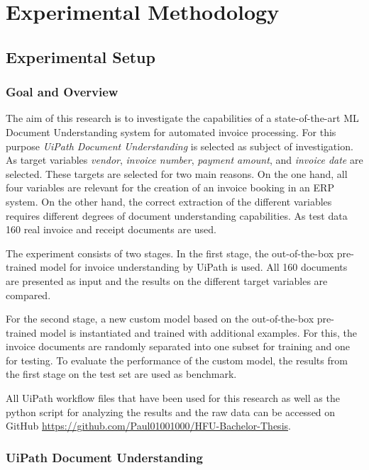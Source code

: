 \chapter{Experimental Methodology}

\section{Experimental Setup}
\subsection{Goal and Overview}
The aim of this research is to investigate the capabilities of a state-of-the-art \acl{ML} Document Understanding system for automated invoice processing. For this purpose \textit{UiPath Document Understanding} is selected as subject of investigation. As target variables \textit{vendor}, \textit{invoice number}, \textit{payment amount}, and \textit{invoice date} are selected. These targets are selected for two main reasons. On the one hand, all four variables are relevant for the creation of an invoice booking in an ERP system. On the other hand, the correct extraction of the different variables requires different degrees of document understanding capabilities. As test data 160 real invoice and receipt documents are used.

The experiment consists of two stages. In the first stage, the out-of-the-box pre-trained model for invoice understanding by UiPath is used. All 160 documents are presented as input and the results on the different target variables are compared. 

For the second stage, a new custom model based on the out-of-the-box pre-trained model is instantiated and trained with additional examples. For this, the invoice documents are randomly separated into one subset for training and one for testing. To evaluate the performance of the custom model, the results from the first stage on the test set are used as benchmark. 

All UiPath workflow files that have been used for this research as well as the python script for analyzing the results and the raw data can be accessed on GitHub \url{https://github.com/Paul01001000/HFU-Bachelor-Thesis}.

\subsection{UiPath Document Understanding}


